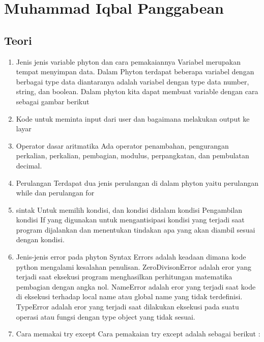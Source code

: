 \section{Muhammad Iqbal Panggabean}
\subsection{Teori}
\begin{enumerate}
    \item Jenis jenis variable phyton dan cara pemakaiannya
Variabel merupakan tempat menyimpan data. Dalam Phyton terdapat beberapa variabel dengan berbagai type data diantaranya adalah variabel dengan type data number, string, dan boolean. Dalam phyton kita dapat membuat variable dengan cara sebagai gambar berikut
   
    \item Kode untuk meminta input dari user dan bagaimana melakukan output ke layar
 
    \item Operator dasar aritmatika
Ada operator penambahan, pengurangan perkalian, perkalian, pembagian, modulus, perpangkatan, dan pembulatan decimal.

    \item Perulangan
Terdapat dua jenis perulangan di dalam phyton yaitu perulangan while dan perulangan for
 
 
    \item sintak Untuk memilih kondisi, dan kondisi didalam kondisi
Pengambilan kondisi If yang digunakan untuk mengantisipasi kondisi yang terjadi saat program dijalankan dan menentukan tindakan apa yang akan diambil sesuai dengan kondisi.
  
  
  

    \item Jenis-jenis error pada phyton
Syntax Errors adalah keadaan dimana kode python mengalami kesalahan penulisan. 
ZeroDivisonError adalah eror yang terjadi saat eksekusi program menghasilkan perhitungan matematika pembagian dengan angka nol.
NameError adalah eror yang terjadi saat kode di eksekusi terhadap local name atau global name yang tidak terdefinisi. 
TypeError adalah eror yang terjadi saat dilakukan eksekusi pada suatu operasi atau fungsi dengan type object yang tidak sesuai.

    \item Cara memakai try except
Cara pemakaian try except adalah sebagai berikut :


\end{enumerate}

